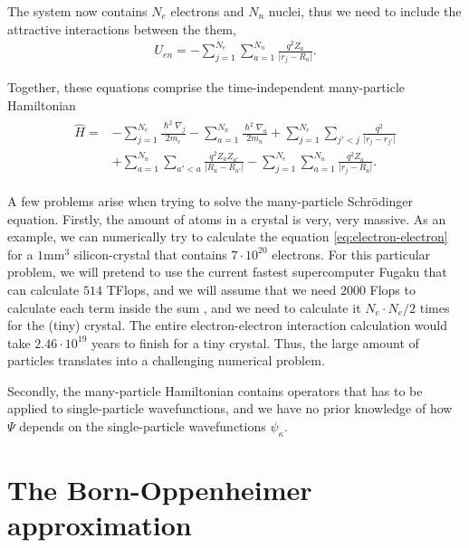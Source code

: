 The system now contains $N_e$ electrons and $N_n$ nuclei, thus we need to include the attractive interactions between the them,
\begin{align}
  U_{en} = - \sum_{j=1}^{N_e} \sum_{a=1}^{N_n} \frac{q^2Z_a}{\lvert r_j-R_a\rvert}.
\end{align}

Together, these equations comprise the time-independent many-particle Hamiltonian
\begin{align}
  \begin{aligned}
    \hat{H} = &- \sum_{j=1}^{N_e} \frac{\hslash^2\nabla_j}{2m_e} - \sum_{a=1}^{N_n} \frac{\hslash^2\nabla_a}{2m_n} + \sum_{j=1}^{N_e}\sum_{j'<j} \frac{q^2}{\lvert r_j - r_{j'}\rvert} \\ &+\sum_{a=1}^{N_n}\sum_{a'<a} \frac{q^2 Z_aZ_{a'}}{\lvert R_a - R_{a'}\rvert } - \sum_{j=1}^{N_e} \sum_{a=1}^{N_n} \frac{q^2Z_a}{\lvert r_j-R_a\rvert}.
  \end{aligned}
\end{align}


A few problems arise when trying to solve the many-particle Schrödinger equation. Firstly, the amount of atoms in a crystal is very, very massive. As an example, we can numerically try to calculate the equation \ref{eq:electron-electron} for a $1$mm$^3$ silicon-crystal that contains $7\cdot 10^{20}$ electrons. For this particular problem, we will pretend to use the current fastest supercomputer Fugaku \cite{Top500} that can calculate $514$ TFlops, and we will assume that we need $2000$ Flops to calculate each term inside the sum \cite{Persson2020}, and we need to calculate it $N_e \cdot N_e/2$ times for the (tiny) crystal. The entire electron-electron interaction calculation would take $2.46 \cdot 10^{19}$ years to finish for a tiny crystal. Thus, the large amount of particles translates into a challenging numerical problem.


Secondly, the many-particle Hamiltonian contains operators that has to be applied to single-particle wavefunctions, and we have no prior knowledge of how $\Psi$ depends on the single-particle wavefunctions $\psi_\kappa$.


\section{The Born-Oppenheimer approximation}

